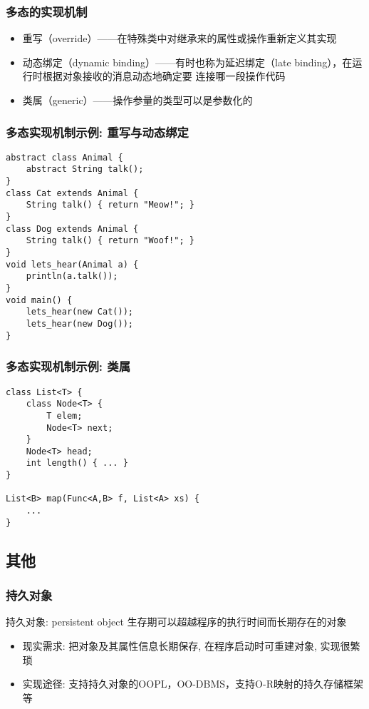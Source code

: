 \documentclass[compress]{beamer}
\begin{document}
\begin{frame}
  \frametitle{多态的实现机制}
    \begin{itemize}
      \item 重写（override）——在特殊类中对继承来的属性或操作重新定义其实现
      \item 动态绑定（dynamic binding）——有时也称为延迟绑定（late
        binding），在运行时根据对象接收的消息动态地确定要
    连接哪一段操作代码
  \item 类属（generic）——操作参量的类型可以是参数化的
\end{itemize}
\end{frame}

\begin{frame}[fragile]
  \frametitle{多态实现机制示例: 重写与动态绑定}

\renewcommand{\baselinestretch}{1.1}
\begin{Verbatim}[fontsize=\footnotesize]
abstract class Animal {
    abstract String talk();
}
class Cat extends Animal {
    String talk() { return "Meow!"; }
}
class Dog extends Animal {
    String talk() { return "Woof!"; }
}
void lets_hear(Animal a) {
    println(a.talk());
}
void main() {
    lets_hear(new Cat());
    lets_hear(new Dog());
}
\end{Verbatim}

\end{frame}

\begin{frame}[fragile]
  \frametitle{多态实现机制示例: 类属}

\begin{Verbatim}
class List<T> {
    class Node<T> {
        T elem;
        Node<T> next;
    }
    Node<T> head;
    int length() { ... }
}
 
List<B> map(Func<A,B> f, List<A> xs) {
    ...
}
\end{Verbatim}

\end{frame}


\subsection{其他}

\begin{frame}
  \frametitle{持久对象}
\begin{block}{持久对象: persistent object}
生存期可以超越程序的执行时间而长期存在的对象
\end{block}
\begin{itemize}
\item 现实需求: 把对象及其属性信息长期保存, 在程序启动时可重建对象, 实现很繁琐
\item 实现途径: 支持持久对象的OOPL，OO-DBMS，支持O-R映射的持久存储框架等
\end{itemize}
\end{frame}
\end{document}
